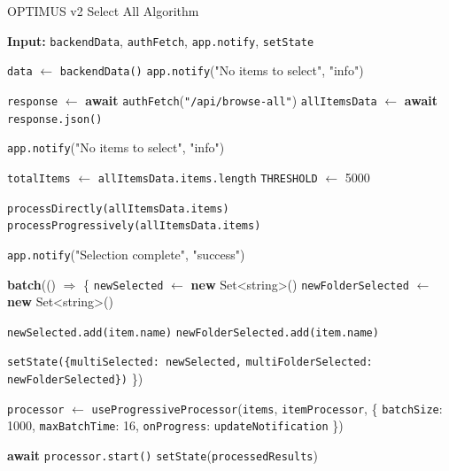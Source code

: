\documentclass[10pt]{article}
\begin{document}
\begin{algorithm}[H]
\caption{OPTIMUS v2 Select All Algorithm}
\label{algo:optimus-v2}
\begin{algorithmic}[1]
    \State \textbf{Input:} \texttt{backendData}, \texttt{authFetch}, \texttt{app.notify}, \texttt{setState}
    
    \State \texttt{data} $\gets$ \texttt{backendData()}
        \State \texttt{app.notify}("No items to select", "info")
        \State \Return
    \EndIf
    
    \State \texttt{response} $\gets$ \textbf{await} \texttt{authFetch}(\texttt{"/api/browse-all"})
    \State \texttt{allItemsData} $\gets$ \textbf{await} \texttt{response.json()}
    
        \State \texttt{app.notify}("No items to select", "info")
        \State \Return
    \EndIf
    
    \State \texttt{totalItems} $\gets$ \texttt{allItemsData.items.length}
    \State \texttt{THRESHOLD} $\gets$ 5000
    
        \State \texttt{processDirectly(allItemsData.items)}
    \Else
        \State \texttt{processProgressively(allItemsData.items)}
    \EndIf
    
    \State \texttt{app.notify}("Selection complete", "success")
\EndFunction

    \State \textbf{batch}(() $\Rightarrow$ \{
        \State \texttt{newSelected} $\gets$ \textbf{new} Set<string>()
        \State \texttt{newFolderSelected} $\gets$ \textbf{new} Set<string>()
        
                \State \texttt{newSelected.add(item.name)}
                \State \texttt{newFolderSelected.add(item.name)}
            \EndIf
        \EndFor
        
        \State \texttt{setState(\{multiSelected: newSelected,}
        \State \quad \texttt{multiFolderSelected: newFolderSelected\})}
    \State \})
\EndFunction

    \State \texttt{processor} $\gets$ \texttt{useProgressiveProcessor}(\texttt{items}, \texttt{itemProcessor}, \{
        \State \quad \texttt{batchSize}: 1000,
        \State \quad \texttt{maxBatchTime}: 16,
        \State \quad \texttt{onProgress}: \texttt{updateNotification}
    \State \})
    
    \State \textbf{await} \texttt{processor.start()}
    \State \texttt{setState}(\texttt{processedResults})
\EndFunction
\end{algorithmic}
\end{algorithm}
\end{document}
